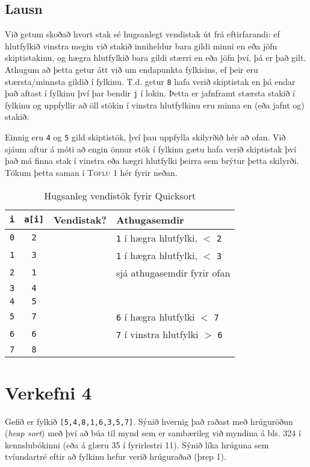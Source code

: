 \documentclass[12pt, a4paper, hidelinks]{article}
\newcommand{\cmark}{\text{\color{Green}\ding{51}}}
\newcommand{\xmark}{\text{\color{Red}\ding{55}}}
\begin{document}
\subsection*{Lausn}
Við getum skoðað hvort stak sé hugsanlegt vendistak út frá eftirfarandi: ef hlutfylkið vinstra megin við stakið inniheldur bara gildi minni en eða jöfn skiptistakinu,
og hægra hlutfylkið bara gildi stærri en eða jöfn því, þá er það gilt. Athugum að þetta getur átt við um endapunkta fylkisins, ef þeir eru stærsta/minnsta gildið í fylkinu.
T.d. getur \texttt{8} hafa verið skiptistak en þá endar það aftast í fylkinu því þar bendir \texttt{j} í lokin. Þetta er jafnframt stærsta stakið í fylkinu og uppfyllir að
öll stökin í vinstra hlutfylkinu eru minna en (eða jafnt og) stakið.

Einnig eru \texttt{4} og \texttt{5} gild skiptistök, því þau uppfylla skilyrðið hér að ofan. Við sjáum aftur á móti að engin önnur stök í fylkinu gætu hafa verið skiptistak því
það má finna stak í vinstra eða hægri hlutfylki þeirra sem brýtur þetta skilyrði. Tökum þetta saman í \textsc{Töflu} 1 hér fyrir neðan.

\begin{table}[H]
\centering
\begin{tabular}{cccl}
\toprule
  \texttt{i} & \texttt{a[i]} & Vendistak? & Athugasemdir \\
  \midrule
  \texttt{0} & \texttt{2} & \xmark & \texttt{1} í hægra hlutfylki, $<$ \texttt{2} \\
  \texttt{1} & \texttt{3} & \xmark & \texttt{1} í hægra hlutfylki, $<$ \texttt{3} \\
  \texttt{2} & \texttt{1} & \xmark & sjá athugasemdir fyrir ofan \\
  \texttt{3} & \texttt{4} & \cmark & \\
  \texttt{4} & \texttt{5} & \cmark & \\
  \texttt{5} & \texttt{7} & \xmark & \texttt{6} í hægra hlutfylki $<$ \texttt{7} \\
  \texttt{6} & \texttt{6} & \xmark & \texttt{7} í vinstra hlutfylki $>$ \texttt{6} \\
  \texttt{7} & \texttt{8} & \cmark & \\
\bottomrule
\end{tabular}
\caption{Hugsanleg vendistök fyrir Quicksort}
\end{table}

\newpage

\section*{Verkefni 4}
Gefið er fylkið \texttt{[5,4,8,1,6,3,5,7]}. Sýnið hvernig það raðast með hrúguröðun (\emph{heap sort}) með því að búa til mynd
sem er sambærileg við myndina á bls. 324 í kennslubókinni (eða á glæru 35 í fyrirlestri 11). Sýnið líka hrúguna sem tvíundartré eftir að
fylkinu hefur verið hrúguraðað (þrep 1).
\end{document}
